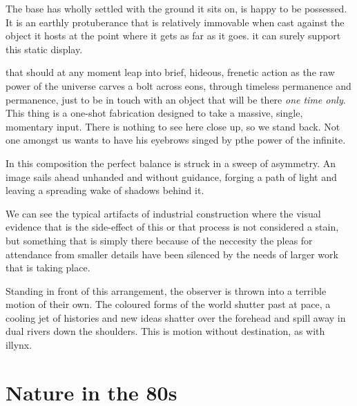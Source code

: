 \documentclass{article}
\begin{document}
The base has wholly settled with the ground it sits on, is happy to be
possessed. It is an earthly protuberance that is relatively immovable when cast
against the object it hosts at the point where it gets as far as it goes.  it
can surely support this static display.

that should at any moment leap into brief, hideous, frenetic action as the raw
power of the universe carves a bolt across eons, through timeless permanence
and permanence, just to be in touch with an object that will be there \emph{one
time only}.  This thing is a one-shot fabrication designed to take a massive,
single, momentary input.  There is nothing to see here close up, so we stand
back. Not one amongst us wants to have his eyebrows singed by pthe power of the
infinite.

In this composition the perfect balance is struck in a sweep of asymmetry. An
image sails ahead unhanded and without guidance, forging a path of light and
leaving a spreading wake of shadows behind it.

We can see the typical artifacts of industrial construction where the visual
evidence that is the side-effect of this or that process is not considered a
stain, but something that is simply there because of the neccesity the pleas
for attendance from smaller details have been silenced by the needs of larger
work that is taking place.

Standing in front of this arrangement, the observer is thrown into a terrible
motion of their own. The coloured forms of the world shutter past at pace,
a cooling jet of histories and new ideas shatter over the forehead and spill
away in dual rivers down the shoulders. This is motion without destination, as
with illynx.

\chapter{Nature in the 80s}
\end{document}
